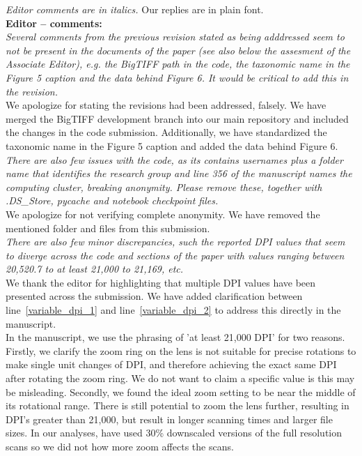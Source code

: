 \documentclass[12pt,a4paper]{article}
\newcommand{\lr}[1]{line~\ref{#1}}
\begin{document}
%



\emph{Editor comments are in italics.} Our replies are in plain font.\\ 

{\bf Editor -- comments:} \\

\emph{Several comments from the previous revision stated as being adddressed seem to not be present in the documents of the paper (see also below the assesment of the Associate Editor), e.g. the BigTIFF path in the code, the taxonomic name in the Figure 5 caption and the data behind Figure 6. It would be critical to add this in the revision.} \\

We apologize for stating the revisions had been addressed, falsely. We have merged the BigTIFF development branch into our main repository and included the changes in the code submission. Additionally, we have standardized the taxonomic name in the Figure 5 caption and added the data behind Figure 6. \\

\emph{There are also few issues with the code, as its contains usernames plus a folder name that identifies the research group and line 356 of the manuscript names the computing cluster, breaking anonymity. Please remove these, together with .DS\_Store, pycache and notebook checkpoint files. } \\

We apologize for not verifying complete anonymity. We have removed the mentioned folder and files from this submission. \\

\emph{There are also few minor discrepancies, such the reported DPI values that seem to diverge across the code and sections of the paper with values ranging between 20,520.7 to at least 21,000 to 21,169, etc.} \\

We thank the editor for highlighting that multiple DPI values have been presented across the submission. We have added clarification between \lr{variable_dpi_1} and \lr{variable_dpi_2} to address this directly in the manuscript. \\

In the manuscript, we use the phrasing of 'at least 21,000 DPI' for two reasons. Firstly, we clarify the zoom ring on the lens is not suitable for precise rotations to make single unit changes of DPI, and therefore achieving the exact same DPI after rotating the zoom ring. We do not want to claim a specific value is this may be misleading. Secondly, we found the ideal zoom setting to be near the middle of its rotational range. There is still potential to zoom the lens further, resulting in DPI's greater than 21,000, but result in longer scanning times and larger file sizes. In our analyses, have used 30\% downscaled versions of the full resolution scans so we did not how more zoom affects the scans. \\
\end{document}
